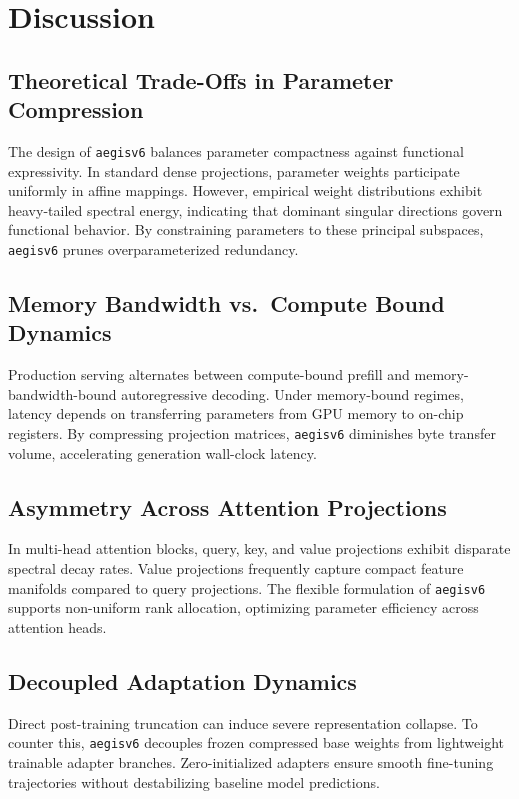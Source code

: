 \section{Discussion}

\subsection{Theoretical Trade-Offs in Parameter Compression}
The design of \texttt{aegisv6} balances parameter compactness against functional expressivity. In standard dense projections, parameter weights participate uniformly in affine mappings. However, empirical weight distributions exhibit heavy-tailed spectral energy, indicating that dominant singular directions govern functional behavior. By constraining parameters to these principal subspaces, \texttt{aegisv6} prunes overparameterized redundancy.

\subsection{Memory Bandwidth vs.\ Compute Bound Dynamics}
Production serving alternates between compute-bound prefill and memory-bandwidth-bound autoregressive decoding. Under memory-bound regimes, latency depends on transferring parameters from GPU memory to on-chip registers. By compressing projection matrices, \texttt{aegisv6} diminishes byte transfer volume, accelerating generation wall-clock latency.

\subsection{Asymmetry Across Attention Projections}
In multi-head attention blocks, query, key, and value projections exhibit disparate spectral decay rates. Value projections frequently capture compact feature manifolds compared to query projections. The flexible formulation of \texttt{aegisv6} supports non-uniform rank allocation, optimizing parameter efficiency across attention heads.

\subsection{Decoupled Adaptation Dynamics}
Direct post-training truncation can induce severe representation collapse. To counter this, \texttt{aegisv6} decouples frozen compressed base weights from lightweight trainable adapter branches. Zero-initialized adapters ensure smooth fine-tuning trajectories without destabilizing baseline model predictions.

